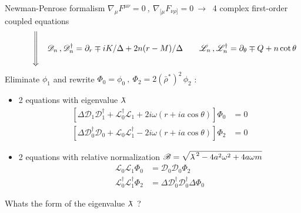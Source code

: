 \documentclass[9pt]{beamer}
\newcommand{\lambdabar}{{\mkern 0.0mu\lambda\mkern -8.2mu\mathchar '26\mkern 2mu}}
\newcommand{\xDownarrow}[1]{%
	{\left\Downarrow\vbox to #1{}\right.\kern-\nulldelimiterspace}
}
\begin{document}
\begin{frame}[fragile]{Newman-Penrose formalism}
    $\nabla_\mu F^{\mu\nu} = 0 ~,~ \nabla_{[\mu} F_{\nu\rho]} = 0  ~\longrightarrow~$ 4 complex first-order coupled equations
    $$\hspace{1.0cm}\xDownarrow{0.8cm} \quad\mathscr{D}_n \,, \mathscr{D}_n^\dagger = \partial_r \mp i K / \Delta + 2n(r-M)/\Delta \qquad 
    \mathscr{L}_n \,, \mathscr{L}_n^\dagger = \partial_\theta \mp Q + n \cot\theta $$
	Eliminate $\phi_1$ and rewrite $\Phi_0 = \phi_0 ~,~ \Phi_2 = 2 (\bar{\rho}^*)^2 \,\phi_2$ :
	\begin{itemize}
		\item 2 equations with eigenvalue $\lambdabar$
		\begin{align*}
			\left[ \Delta \mathscr{D}_1 \mathscr{D}^\dagger_1 + \mathscr{L}^\dagger_0 \mathscr{L}_1 + 2 i \omega (r+i a \cos\theta) \right] \Phi_0 &= 0 \\
			\left[ \Delta \mathscr{D}^\dagger_0 \mathscr{D}_0 + \mathscr{L}_0 \mathscr{L}^\dagger_1 - 2 i \omega (r+i a \cos\theta) \right] \Phi_2 &= 0
		\end{align*}
		
		\item 2 equations with relative normalization $\mathscr{B} = \sqrt{\lambdabar^2 - 4 a^2 \omega^2 + 4 a \omega m}$
		\begin{equation*}
		\begin{aligned}
			\mathscr{L}_0 \mathscr{L}_1 \Phi_0 &= \mathscr{D}_0 \mathscr{D}_0 \Phi_2 ~\\
			\mathscr{L}^\dagger_0 \mathscr{L}^\dagger_1 \Phi_2 &= \Delta \mathscr{D}^\dagger_0 \mathscr{D}^\dagger_0 \Delta \Phi_0
		\end{aligned}
		\end{equation*}
	\end{itemize}
	\vfill
	Whats the form of the eigenvalue $\lambdabar$ ?

\end{frame}
\end{document}
